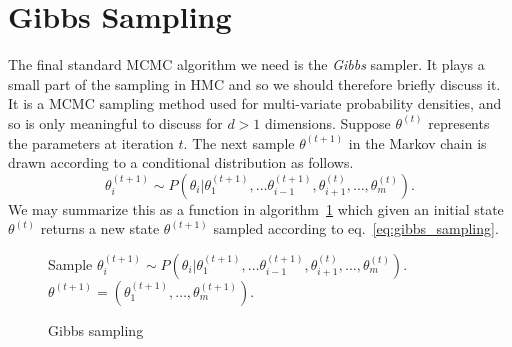 \section{Gibbs Sampling}
The final standard MCMC algorithm we need is the \textit{Gibbs} sampler. It plays a small
part of the sampling in HMC and so we should therefore briefly discuss it.
It is a MCMC sampling method used for multi-variate probability densities, and
so is only meaningful to discuss for $d > 1$ dimensions.
Suppose $\theta^{(t)}$ represents the parameters at iteration $t$. 
The next sample $\theta^{(t+1)}$ in the Markov chain is drawn according to a
conditional distribution as follows.
\begin{equation}\label{eq:gibbs_sampling}
  \theta_i^{(t+1)} \sim P(\theta_i|\theta_{1}^{(t+1)}, \ldots \theta_{i-1}^{(t+1)}, \theta_{i+1}^{(t)}, \ldots, \theta_{m}^{(t)}).
\end{equation}
We may summarize this as a function in algorithm~\ref{algo:gibbs} which 
given an initial state $\theta^{(t)}$ returns a new state $\theta^{(t+1)}$
sampled according to eq.~\eqref{eq:gibbs_sampling}.
\begin{figure}[H]
  \begin{algorithm}[H]
    \caption{Gibbs sampling}\label{algo:gibbs}
    \begin{algorithmic}
          \State Sample $\theta_i^{(t+1)} \sim P(\theta_i|\theta_{1}^{(t+1)}, \ldots \theta_{i-1}^{(t+1)}, \theta_{i+1}^{(t)}, \ldots, \theta_{m}^{(t)}).$
        \EndFor \\
        \Return $\theta^{(t+1)} = \left(\theta_1^{(t+1)}, \ldots, \theta_m^{(t+1)}\right)$.
      \EndFunction
    \end{algorithmic}
  \end{algorithm}
\end{figure}


